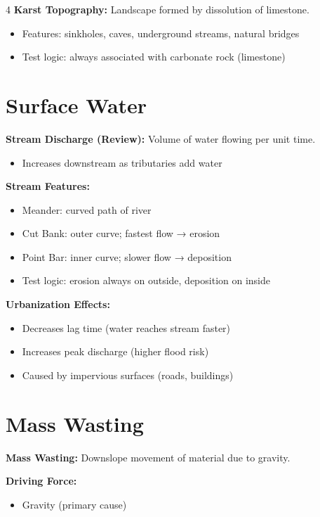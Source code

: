 \documentclass[10pt]{article}
\begin{document}
\begin{multicols}{4}
\textbf{Karst Topography:}
Landscape formed by dissolution of limestone.
\begin{itemize}
\item Features: sinkholes, caves, underground streams, natural bridges
\item Test logic: always associated with carbonate rock (limestone)
\end{itemize}

\section*{Surface Water}

\textbf{Stream Discharge (Review):}
Volume of water flowing per unit time.
\begin{itemize}
\item Increases downstream as tributaries add water
\end{itemize}

\textbf{Stream Features:}
\begin{itemize}
\item Meander: curved path of river
\item Cut Bank: outer curve; fastest flow → erosion
\item Point Bar: inner curve; slower flow → deposition
\item Test logic: erosion always on outside, deposition on inside
\end{itemize}

\textbf{Urbanization Effects:}
\begin{itemize}
\item Decreases lag time (water reaches stream faster)
\item Increases peak discharge (higher flood risk)
\item Caused by impervious surfaces (roads, buildings)
\end{itemize}

\section*{Mass Wasting}

\textbf{Mass Wasting:}
Downslope movement of material due to gravity.

\textbf{Driving Force:}
\begin{itemize}
\item Gravity (primary cause)
\end{itemize}


\end{multicols}
\end{document}
